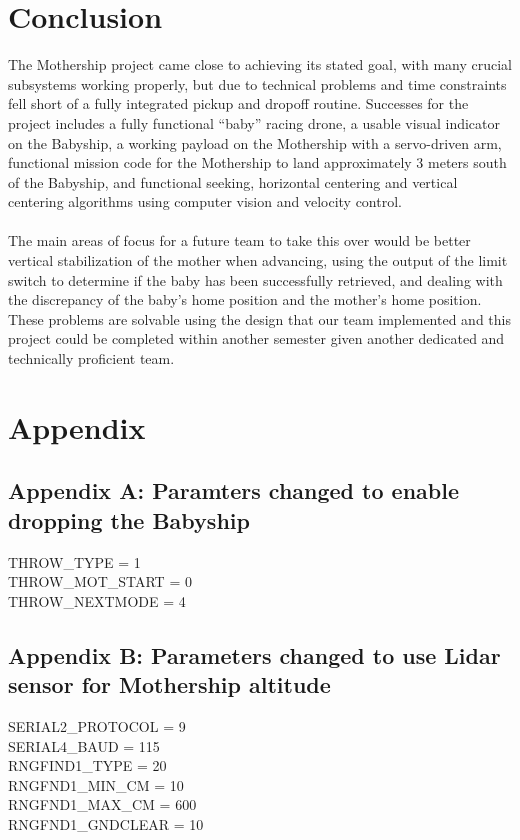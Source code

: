 \documentclass[11pt]{article}
\begin{document}
\section{Conclusion}
The Mothership project came close to achieving its stated goal, with many crucial subsystems working properly, but due to technical problems and time constraints fell short of a fully integrated pickup and dropoff routine. Successes for the project includes a fully functional “baby” racing drone, a usable visual indicator on the Babyship, a working payload on the Mothership with a servo-driven arm, functional mission code for the Mothership to land approximately 3 meters south of the Babyship, and functional seeking, horizontal centering and vertical centering algorithms using computer vision and velocity control.\\\\
The main areas of focus for a future team to take this over would be better vertical stabilization of the mother when advancing, using the output of the limit switch to determine if the baby has been successfully retrieved, and dealing with the discrepancy of the baby’s home position and the mother’s home position. These problems are solvable using the design that our team implemented and this project could be completed within another semester given another dedicated and technically proficient team.




\section*{Appendix}
\subsection*{Appendix A: Paramters changed to enable dropping the Babyship}
THROW\_TYPE = 1\\
THROW\_MOT\_START = 0\\
THROW\_NEXTMODE = 4

\subsection*{Appendix B: Parameters changed to use Lidar sensor for Mothership altitude}
SERIAL2\_PROTOCOL = 9\\
SERIAL4\_BAUD = 115\\
RNGFIND1\_TYPE = 20\\
RNGFND1\_MIN\_CM = 10\\
RNGFND1\_MAX\_CM = 600\\
RNGFND1\_GNDCLEAR = 10
\end{document}
